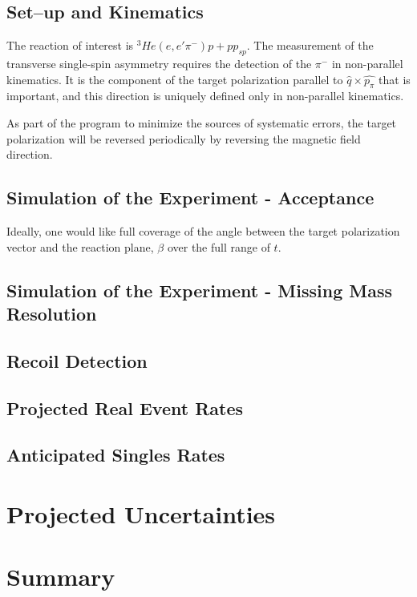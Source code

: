 \documentclass[preprint,superscriptaddress]{revtex4}
\begin{document}
\subsection{Set--up and Kinematics}


The reaction of interest is $^3He(e,e'\pi^-)p+pp_{sp}$.  The measurement of
the transverse single-spin asymmetry requires the detection of the $\pi^-$ in
non-parallel kinematics.  It is the component of the target polarization
parallel to $\hat{q}\times\hat{p_{\pi}}$ that is important, and this direction
is uniquely defined only in non-parallel kinematics.

As part of the program to minimize the sources of systematic errors, the target
polarization will be reversed periodically by reversing the magnetic field 
direction.

\subsection{Simulation of the Experiment - Acceptance}

Ideally, one would like full coverage of the angle between the target 
polarization vector and the reaction plane, $\beta$ over the full range of $t$.

\subsection{Simulation of the Experiment - Missing Mass Resolution}

\subsection{Recoil Detection}

\subsection{Projected Real Event Rates}

\subsection{Anticipated Singles Rates}

\section{Projected Uncertainties}

\section{Summary}
\end{document}
